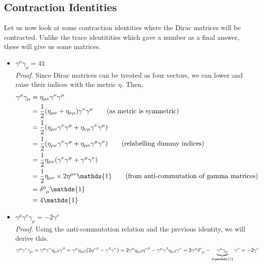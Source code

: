 \subsection{Contraction Identities}
Let us now look at some contraction identities where the Dirac matrices will be contracted. Unlike the trace identitities which gave a number as a final answer, these will give us some matrices. 
\begin{itemize}
    \item $\gamma^\mu \gamma_\mu = 4\mathds{1}$\\[0.25cm]
    \textit{Proof.} Since Dirac matrices can be treated as four vectors, we can lower and raise their indices with the metric $\eta$. Then, 
    \begin{align*}
        \gamma^\mu \gamma_\mu &= \eta_{\mu\nu}\gamma^{\nu}\gamma^{\mu}\\
        &=\frac{1}{2}\qty(\eta_{\mu\nu} + \eta_{\nu\mu})\gamma^{\nu}\gamma^{\mu} \qquad (\text{as metric is symmetric})\\
        &=\frac{1}{2}\qty(\eta_{\mu\nu}\gamma^{\nu}\gamma^{\mu}  + \eta_{\nu\mu}\gamma^{\nu}\gamma^{\mu} )\\
        &=\frac{1}{2}\qty(\eta_{\mu\nu}\gamma^{\nu}\gamma^{\mu}  + \eta_{\mu\nu}\gamma^{\mu}\gamma^{\nu} )\qquad (\text{relabelling dummy indices})\\ 
        &=\frac{1}{2}\eta_{\mu\nu} \qty(\gamma^{\nu}\gamma^{\mu}  + \gamma^{\mu}\gamma^{\nu} )\\
        &=\frac{1}{2}\eta_{\mu\nu}  \times 2\eta^{\mu\nu}\mathds{1}\qquad (\text{from anti-commutation of gamma matrices})\\
        &=\tensor{\delta}{^\mu _\mu}\mathds{1}\\
        &=4\mathds{1}
    \end{align*}
    \item $\gamma^\mu \gamma^\nu \gamma_\mu = -2\gamma^\nu$\\[0.25cm]
    \textit{Proof.} Using the anti-commutation relation and the previous identity, we will derive this.
    \begin{align*}
        \gamma^\mu \gamma^\nu \gamma_\mu =\gamma^\mu \gamma^\nu \eta_{\mu\beta}\gamma^\beta =\gamma^\mu \eta_{\mu\beta}\qty(2\eta^{\nu\beta}-\gamma^\beta \gamma^\nu) = 2\gamma^\mu \eta_{\mu\beta}\eta^{\nu\beta} - \gamma^\mu \gamma^\beta \eta_{\mu\beta}\gamma^\nu =2\gamma^\mu\tensor{\delta}{^\nu _\mu} - \underbrace{\gamma^\mu \gamma_\mu}_{4\mathds{1}} \gamma^\nu=-2\gamma^\nu
    \end{align*}

\end{itemize}
